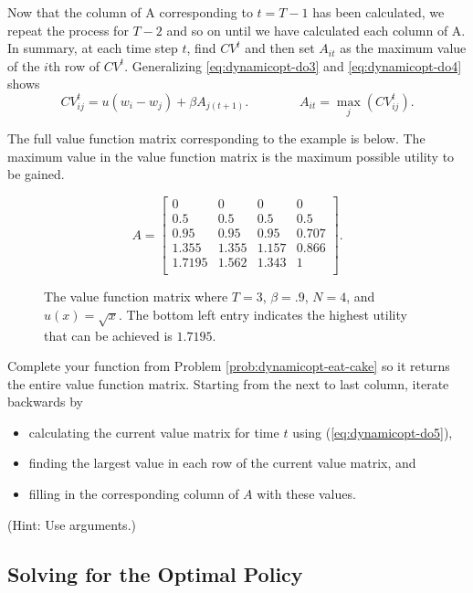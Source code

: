 Now that the column of A corresponding to $t = T-1$ has been calculated, we repeat the process for $T-2$ and so on until we have calculated each column of A.
In summary, at each time step $t$, find $CV^t$ and then set $A_{it}$ as the maximum value of the $i$th row of $CV^t$.
Generalizing \eqref{eq:dynamicopt-do3} and \eqref{eq:dynamicopt-do4} shows
\begin{equation}\label{eq:dynamicopt-do5}
CV^{t}_{ij} = u(w_i - w_j) + \beta A_{j(t+1)}.
\qquad \qquad
A_{it} = \max_{j} \left(CV_{ij}^t \right).
\end{equation}

The full value function matrix corresponding to the example is below.
The maximum value in the value function matrix is the maximum possible utility to be gained.

\begin{figure}[H]
\[
A =
\begin{bmatrix}
0 & 0 & 0 & 0 \\
0.5 & 0.5 & 0.5 & 0.5 \\
0.95 & 0.95 & 0.95 & 0.707 \\
1.355 & 1.355 & 1.157 & 0.866 \\
1.7195 & 1.562 & 1.343 & 1 \\
\end{bmatrix}
.
\]
\caption{The value function matrix where $T=3$, $\beta=.9$, $N=4$, and $u(x) = \sqrt{x}$. The bottom left entry indicates the highest utility that can be achieved is $1.7195$.}
\label{fig:2nd_val_func_matrix}
\end{figure}

\begin{problem}
Complete your function from Problem \ref{prob:dynamicopt-eat-cake} so it returns the entire value function matrix.
Starting from the next to last column, iterate backwards by
\begin{itemize}
\item calculating the current value matrix for time $t$ using (\ref{eq:dynamicopt-do5}),
\item finding the largest value in each row of the current value matrix, and
\item filling in the corresponding column of $A$ with these values.
\end{itemize}
(Hint: Use  arguments.)
\end{problem}

\subsection*{Solving for the Optimal Policy} %

